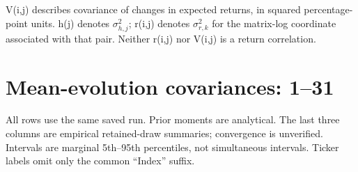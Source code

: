 \documentclass[10pt,a4paper]{article}
\begin{document}
\par\medskip\footnotesize
V(i,j) describes covariance of changes in expected returns, in squared percentage-point units.
h(j) denotes $\sigma_{h,j}^{2}$; r(i,j) denotes $\sigma_{r,k}^{2}$ for the matrix-log coordinate
associated with that pair. Neither r(i,j) nor V(i,j) is a return correlation.

\clearpage\section*{Mean-evolution covariances: 1--31}

\small All rows use the same saved run. Prior moments are analytical.
The last three columns are empirical retained-draw summaries; convergence is unverified.
Intervals are marginal 5th--95th percentiles, not simultaneous intervals.
Ticker labels omit only the common ``Index'' suffix.
\par\medskip
\begingroup\fontsize{7.8}{10.5}\selectfont\setlength{\tabcolsep}{3pt}
\renewcommand{\arraystretch}{1.45}
\end{document}
